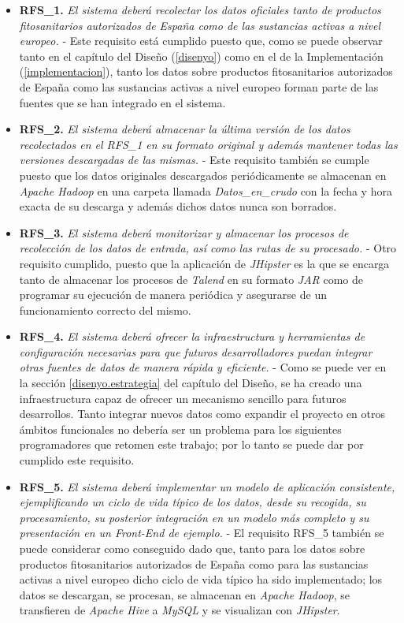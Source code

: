  \begin{itemize}
 \item \textbf{RFS\_1. } \textit{El sistema deberá recolectar los datos oficiales tanto de productos fitosanitarios autorizados de España como de las sustancias activas a nivel europeo.} - Este requisito está cumplido puesto que, como se puede observar tanto en el capítulo del Diseño (\ref{disenyo}) como en el de la Implementación (\ref{implementacion}), tanto los datos sobre productos fitosanitarios autorizados de España como las sustancias activas a nivel europeo forman parte de las fuentes que se han integrado en el sistema.
 \item \textbf{RFS\_2. } \textit{El sistema deberá almacenar la última versión de los datos recolectados en el RFS\_1 en su formato original y además mantener todas las versiones descargadas de las mismas.} - Este requisito también se cumple puesto que los datos originales descargados periódicamente se almacenan en \textit{Apache Hadoop} en una carpeta llamada \textit{Datos\_en\_crudo} con la fecha y hora exacta de su descarga y además dichos datos nunca son borrados. 
 \item \textbf{RFS\_3. } \textit{El sistema deberá monitorizar y almacenar los procesos de recolección de los datos de entrada, así como las rutas de su procesado.} - Otro requisito cumplido, puesto que la aplicación de \textit{JHipster} es la que se encarga tanto de almacenar los procesos de \textit{Talend} en su formato \textit{JAR} como de programar su ejecución de manera periódica y asegurarse de un funcionamiento correcto del mismo.  
 \item \textbf{RFS\_4. } \textit{El sistema deberá ofrecer la infraestructura y herramientas de configuración necesarias para que futuros desarrolladores puedan integrar otras fuentes de datos de manera rápida y eficiente.} - Como se puede ver en la sección \ref{disenyo.estrategia} del capítulo del Diseño, se ha creado una infraestructura capaz de ofrecer un mecanismo sencillo para futuros desarrollos. Tanto integrar nuevos datos como expandir el proyecto en otros ámbitos funcionales no debería ser un problema para los siguientes programadores que retomen este trabajo; por lo tanto se puede dar por cumplido este requisito. 
 \item \textbf{RFS\_5. } \textit{El sistema deberá implementar un modelo de aplicación consistente, ejemplificando un ciclo de vida típico de los datos, desde su recogida, su procesamiento, su posterior integración en un modelo más completo y su presentación en un \textit{Front-End} de ejemplo.} - El requisito RFS\_5 también se puede considerar como conseguido dado que, tanto para los datos sobre productos fitosanitarios autorizados de España como para las sustancias activas a nivel europeo dicho ciclo de vida típico ha sido implementado; los datos se descargan, se procesan, se almacenan en \textit{Apache Hadoop}, se transfieren de \textit{Apache Hive} a \textit{MySQL} y se visualizan con \textit{JHipster}.

\end{itemize}
